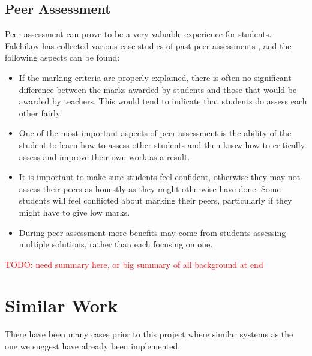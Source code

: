 \documentclass[a4paper,11pt]{report}
\newcommand{\todo}[1]{\textcolor{red}{TODO: #1}}
\begin{document}
\subsection{Peer Assessment}
Peer assessment can prove to be a very valuable experience for students. Falchikov has collected various case studies of past peer assessments \cite{falchikov_improving_2013}, and the following aspects can be found:
\begin{itemize}
 \item If the marking criteria are properly explained, there is often no significant difference between the marks awarded by students and those that would be awarded by teachers. This would tend to indicate that students do assess each other fairly.
 \item One of the most important aspects of peer assessment is the ability of the student to learn how to assess other students and then know how to critically assess and improve their own work as a result.
 \item It is important to make sure students feel confident, otherwise they may not assess their peers as honestly as they might otherwise have done. Some students will feel conflicted about marking their peers, particularly if they might have to give low marks.
 \item During peer assessment more benefits may come from students assessing multiple solutions, rather than each focusing on one.
\end{itemize}

\todo{need summary here, or big summary of all background at end}


\section{Similar Work}
There have been many cases prior to this project where similar systems as the one we suggest have already been implemented. 
\end{document}
